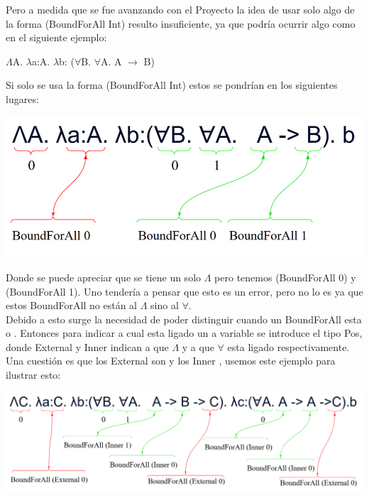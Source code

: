 \documentclass[12pt, titlepage, a4paper]{article}
\begin{document}
\begin{itemize}[label=$\bullet$]
{  Pero a medida que se fue avanzando con el Proyecto la idea de usar solo algo de la forma (BoundForAll Int) resulto insuficiente, ya que podría ocurrir algo 
  como en el siguiente ejemplo:
  
  \begin{center}
    $\Lambda$A. $\lambda$a:A. $\lambda$b: ($\forall$B. $\forall$A. A $\rightarrow$ B)
  \end{center}

  Si solo se usa la forma (BoundForAll Int) estos se pondrían en los siguientes lugares:

  \begin{center}
    \includegraphics[width=.8\textwidth]{Imagenes/EjemploBoundForAllFunction.png}
  \end{center}

  Donde se puede apreciar que se tiene un solo $\Lambda$ pero tenemos (BoundForAll 0) y (BoundForAll 1). Uno tendería a 
  pensar que esto es un error, pero no lo es ya que estos BoundForAll no están  al $\Lambda$ sino al $\forall$.\\

  Debido a esto surge la necesidad de poder distinguir cuando un BoundForAll esta  o . 
  Entonces para indicar a cual esta ligado un a variable se introduce el tipo Pos, donde External y Inner indican a que $\Lambda$ y a que $\forall$ esta 
  ligado respectivamente. 
  Una cuestión es que los External son  y los Inner , usemos este ejemplo para ilustrar esto:


  \begin{center}
    \includegraphics[width=1\textwidth]{Imagenes/EjemploBoundForAllFunction3.png}
  \end{center}

}
\end{itemize}
\end{document}

